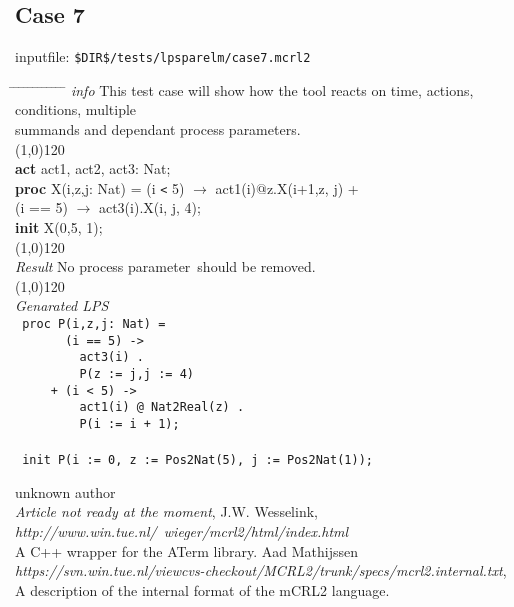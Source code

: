 \documentclass[a4paper,10pt]{article}
\theoremstyle{plain}
\theoremstyle{definition}
\newcommand{\ti}{\textit}
\newcommand{\tb}{\textbf}
\newcommand{\pp}{process parameter}
\newcommand{\pps}{process parameters}
\newcommand{\tabw}{\hspace*{15.mm} \= \hspace*{20.mm} \= \hspace*{5.mm} \= \hspace*{5.mm} \= \hspace*{5.mm} \= \hspace*{5.mm}  \= \hspace*{5.mm}  \= \hspace*{5.mm}  \= \hspace*{5.mm} \= \hspace*{5.mm} \= \hspace*{5.mm}  \= \hspace*{5.mm}  \= \hspace*{5.mm}\kill}
\begin{document}
\subsection*{Case 7}
inputfile: \verb"$DIR$/tests/lpsparelm/case7.mcrl2"
\begin{tabbing}
\tabw
\ti{info} \> This test case will show how the tool reacts on time, actions, conditions, multiple \\
	\> summands and dependant \pps.\\
\line(1,0){120}\\
\tb{act}  \> act1, act2, act3: Nat;\\
\tb{proc} \> X(i,z,j: Nat) \>    = \>  (i \verb"<"  5) $\rightarrow$ act1(i)$@$z.X(i+1,z, j) +\\
          \>               \>  \> (i == 5) $\rightarrow$ act3(i).X(i, j, 4); \\
\tb{init} X(0,5, 1);\\
\line(1,0){120}\\
\ti{Result} \> No \pp\ should be removed.\\ 
\line(1,0){120}\\
\ti{Genarated LPS} \\
\>  \verb" proc P(i,z,j: Nat) ="\\
\>  \verb"       (i == 5) ->"\\
\>  \verb"         act3(i) ."\\
\>  \verb"         P(z := j,j := 4)"\\
\>  \verb"     + (i < 5) ->"\\
\>  \verb"         act1(i) @ Nat2Real(z) ."\\
\>  \verb"         P(i := i + 1);"\\
\\
\>  \verb" init P(i := 0, z := Pos2Nat(5), j := Pos2Nat(1));"\\
\end{tabbing}

\begin{thebibliography}{99}  
    unknown author \\
   \textit{Article not ready at the moment},
   J.W. Wesselink,
   \textit{http://www.win.tue.nl/~wieger/mcrl2/html/index.html}\\
   A C++ wrapper for the ATerm library.
    Aad Mathijssen\\
   \textit{https://svn.win.tue.nl/viewcvs-checkout/MCRL2/trunk/specs/mcrl2.internal.txt},
   A description of the internal format of the mCRL2 language.



\end{thebibliography}
\end{document}
